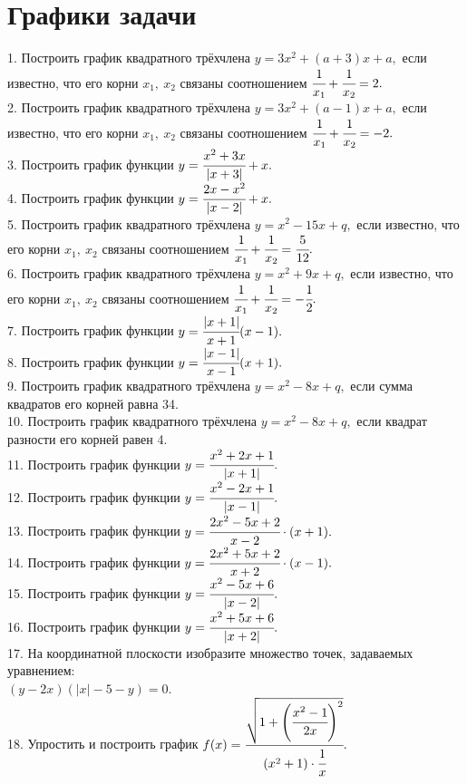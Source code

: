 \documentclass[12pt]{article}
\begin{document}
\section{Графики задачи}
1. Построить график квадратного трёхчлена $y=3x^2+(a+3)x+a,$ если известно,
что его корни $x_1,\ x_2$ связаны соотношением $\cfrac{1}{x_1}+\cfrac{1}{x_2}=2.$\\
2. Построить график квадратного трёхчлена $y=3x^2+(a-1)x+a,$ если известно,
что его корни $x_1,\ x_2$ связаны соотношением $\cfrac{1}{x_1}+\cfrac{1}{x_2}=-2.$\\
3. Построить график функции $y=\cfrac{x^2+3x}{|x+3|}+x.$\\
4. Построить график функции $y=\cfrac{2x-x^2}{|x-2|}+x.$\\
5. Построить график квадратного трёхчлена $y=x^2-15x+q,$ если известно,
что его корни $x_1,\ x_2$ связаны соотношением $\cfrac{1}{x_1}+\cfrac{1}{x_2}=\cfrac{5}{12}.$\\
6. Построить график квадратного трёхчлена $y=x^2+9x+q,$ если известно,
что его корни $x_1,\ x_2$ связаны соотношением $\cfrac{1}{x_1}+\cfrac{1}{x_2}=-\cfrac{1}{2}.$\\
7. Построить график функции $y=\cfrac{|x+1|}{x+1}(x-1).$\\
8. Построить график функции $y=\cfrac{|x-1|}{x-1}(x+1).$\\
9. Построить график квадратного трёхчлена $y=x^2-8x+q,$ если сумма квадратов его корней равна 34.\\
10. Построить график квадратного трёхчлена $y=x^2-8x+q,$ если квадрат разности его корней равен 4.\\
11. Построить график функции $y=\cfrac{x^2+2x+1}{|x+1|}.$\\
12. Построить график функции $y=\cfrac{x^2-2x+1}{|x-1|}.$\\
13. Построить график функции $y=\cfrac{2x^2-5x+2}{x-2}\cdot(x+1).$\\
14. Построить график функции $y=\cfrac{2x^2+5x+2}{x+2}\cdot(x-1).$\\
15. Построить график функции $y=\cfrac{x^2-5x+6}{|x-2|}.$\\
16. Построить график функции $y=\cfrac{x^2+5x+6}{|x+2|}.$\\
17. На координатной плоскости изобразите множество точек, задаваемых уравнением:\\ $(y-2x)\left(|x|-5-y\right)=0.$\\
18. Упростить и построить график $f(x)=\cfrac{\sqrt{1+\left(\cfrac{x^2-1}{2x}\right)^2}}{(x^2+1)\cdot\cfrac{1}{x}}.$\\
\end{document}

